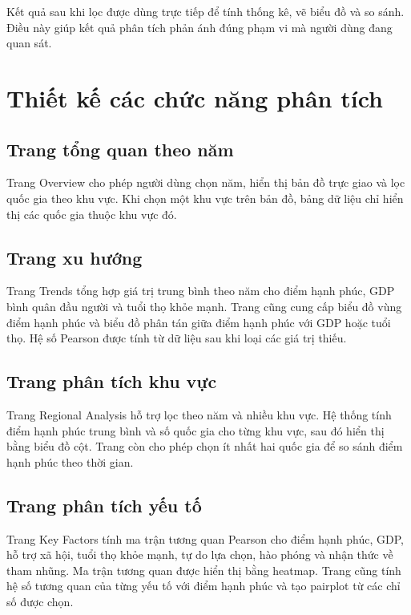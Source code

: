 Kết quả sau khi lọc được dùng trực tiếp để tính thống kê, vẽ biểu đồ và so sánh. Điều này giúp kết quả phân tích phản ánh đúng phạm vi mà người dùng đang quan sát.

\section{Thiết kế các chức năng phân tích}

\subsection{Trang tổng quan theo năm}

Trang Overview cho phép người dùng chọn năm, hiển thị bản đồ trực giao và lọc quốc gia theo khu vực. Khi chọn một khu vực trên bản đồ, bảng dữ liệu chỉ hiển thị các quốc gia thuộc khu vực đó.

\subsection{Trang xu hướng}

Trang Trends tổng hợp giá trị trung bình theo năm cho điểm hạnh phúc, GDP bình quân đầu người và tuổi thọ khỏe mạnh. Trang cũng cung cấp biểu đồ vùng điểm hạnh phúc và biểu đồ phân tán giữa điểm hạnh phúc với GDP hoặc tuổi thọ. Hệ số Pearson được tính từ dữ liệu sau khi loại các giá trị thiếu.

\subsection{Trang phân tích khu vực}

Trang Regional Analysis hỗ trợ lọc theo năm và nhiều khu vực. Hệ thống tính điểm hạnh phúc trung bình và số quốc gia cho từng khu vực, sau đó hiển thị bằng biểu đồ cột. Trang còn cho phép chọn ít nhất hai quốc gia để so sánh điểm hạnh phúc theo thời gian.

\subsection{Trang phân tích yếu tố}

Trang Key Factors tính ma trận tương quan Pearson cho điểm hạnh phúc, GDP, hỗ trợ xã hội, tuổi thọ khỏe mạnh, tự do lựa chọn, hào phóng và nhận thức về tham nhũng. Ma trận tương quan được hiển thị bằng heatmap. Trang cũng tính hệ số tương quan của từng yếu tố với điểm hạnh phúc và tạo pairplot từ các chỉ số được chọn.

